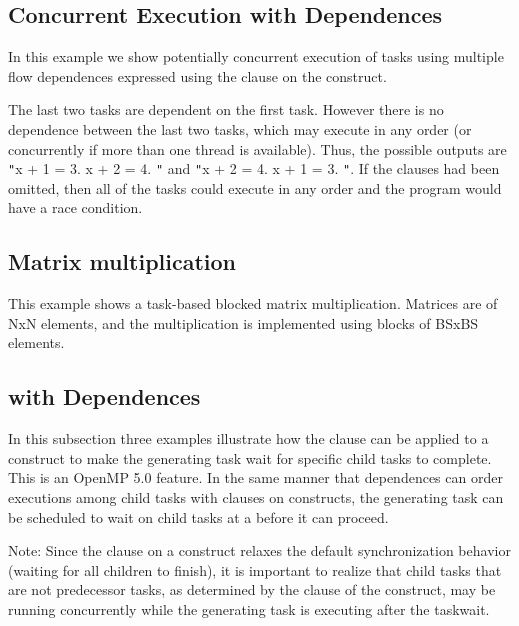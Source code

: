 \pagebreak
\subsection{Concurrent Execution with Dependences}
\label{subsec:task_concurrent_depend}

In this example we show potentially concurrent execution of tasks using multiple 
flow dependences expressed using the  clause on the  
construct.



The last two tasks are dependent on the first task. However there is no dependence 
between the last two tasks, which may execute in any order (or concurrently if 
more than one thread is available). Thus, the possible outputs are \texttt{"}x 
+ 1 = 3. x + 2 = 4. \texttt{"} and \texttt{"}x + 2 = 4. x + 1 = 3. \texttt{"}. 
If the  clauses had been omitted, then all of the tasks could execute 
in any order and the program would have a race condition.

\subsection{Matrix multiplication}
\label{subsec:task_matrix_mult}

This example shows a task-based blocked matrix multiplication. Matrices are of 
NxN elements, and the multiplication is implemented using blocks of BSxBS elements.



\subsection{ with Dependences}
\label{subsec:taskwait_depend}

In this subsection three examples illustrate how the
 clause can be applied to a  construct to make the
generating task wait for specific child tasks to complete. This is an OpenMP 5.0 feature.
 In the same manner that
dependences can order executions among child tasks with  clauses on
 constructs, the generating task can be scheduled to wait on child tasks
at a  before it can proceed.

Note: Since the  clause on a  construct relaxes the
default synchronization behavior (waiting for all children to finish), it is important to
realize that child tasks that are not predecessor tasks, as determined by the 
clause of the  construct, may be running concurrently while the
generating task is executing after the taskwait.

